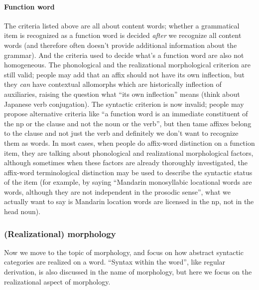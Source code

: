 \documentclass[a4paper, oneside, 12pt]{report}
\begin{document}
{\paragraph{Function word} The criteria listed above are all about content words;
whether a grammatical item is recognized as a function word 
is decided \emph{after} we recognize all content words
(and therefore often doesn't provide additional information about the grammar).
And the criteria used to decide what's a function word 
are also not homogeneous.
The phonological and the realizational morphological criterion are still valid;
people may add that an affix should not have its own inflection,
but they \emph{can} have contextual allomorphs 
which are historically inflection of auxiliaries,
raising the question what ``its own inflection'' means 
(think about Japanese verb conjugation).
The syntactic criterion is now invalid; 
people may propose alternative criteria like 
``a function word is an immediate constituent of the \acs{np} or the clause
and not the noun or the verb'',
but then \acs{tame} affixes belong to the clause and not just the verb
and definitely we don't want to recognize them as words.
In most cases, when people do affix-word distinction on a function item, 
they are talking about phonological and realizational morphological factors,
although sometimes when these factors are already thoroughly investigated, 
the affix-word terminological distinction may be used 
to describe the syntactic status of the item 
(for example, by saying ``Mandarin monosyllabic locational words 
are words, although they are not independent in the prosodic sense'',
what we actually want to say is Mandarin location words are licensed 
in the \acs{np}, not in the head noun).

\subsubsection{(Realizational) morphology}

Now we move to the topic of morphology,
and focus on how abstract syntactic categories are realized on a word.
``Syntax within the word'',
like regular derivation,
is also discussed in the name of morphology,
but here we focus on the realizational aspect of morphology.

}
\end{document}
